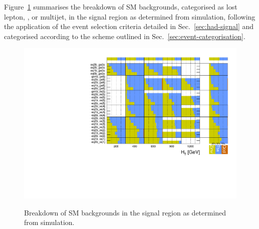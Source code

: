 Figure~\ref{fig:breakdownmc} summarises the breakdown of SM
backgrounds, categorised as lost lepton, \znunuj, or multijet, in the
signal region as determined from simulation, following the application
of the event selection criteria detailed in Sec.~\ref{sec:had-signal}
and categorised according to the scheme outlined in
Sec.~\ref{sec:event-categorisation}.

\begin{figure}[h!]
  \centering
  \caption{Breakdown of SM backgrounds in the signal region as
    determined from simulation.}
  \label{fig:breakdownmc}
  \includegraphics[width=0.8\linewidth]{figures/results/36invfb/breakdown/prefit/Signal_sample_composition.pdf}\\
\end{figure}
